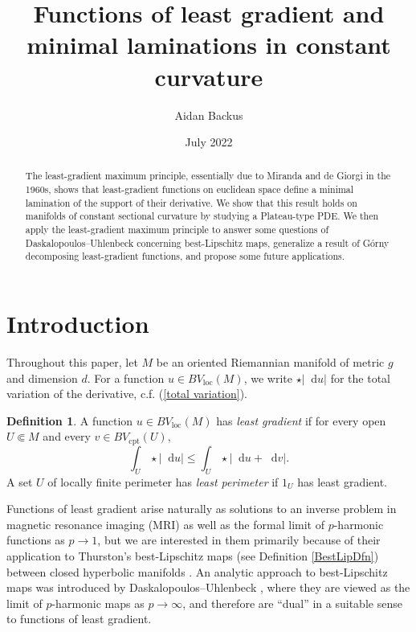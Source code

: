 \documentclass[reqno,10pt]{amsart}
\title{Functions of least gradient and minimal laminations in constant curvature}
\author{Aidan Backus}
\date{July 2022}
\newcommand*\dif{\mathop{}\!\mathrm{d}}
\newcommand{\dfn}[1]{\emph{#1}\index{#1}}
\newcommand{\loc}{\mathrm{loc}}
\newcommand{\cpt}{\mathrm{cpt}}
\theoremstyle{definition}
\newtheorem{definition}[theorem]{Definition}
\numberwithin{equation}{section}
\begin{document}
\begin{abstract}
The least-gradient maximum principle, essentially due to Miranda and de Giorgi in the 1960s, shows that least-gradient functions on euclidean space define a minimal lamination of the support of their derivative.
We show that this result holds on manifolds of constant sectional curvature by studying a Plateau-type PDE.
We then apply the least-gradient maximum principle to answer some questions of Daskalopoulos--Uhlenbeck concerning best-Lipschitz maps, generalize a result of G\'orny decomposing least-gradient functions, and propose some future applications.
\end{abstract}

\maketitle



\section{Introduction}
Throughout this paper, let $M$ be an oriented Riemannian manifold of metric $g$ and dimension $d$.
For a function $u \in BV_\loc(M)$, we write $\star |\dif u|$ for the total variation of the derivative, c.f. (\ref{total variation}).

\begin{definition}\label{main definitions}
A function $u \in BV_\loc(M)$ has \dfn{least gradient} if for every open $U \Subset M$ and every $v \in BV_\cpt(U)$,
\begin{equation}\label{least gradient functional}
\int_U \star |\dif u| \leq \int_U \star |\dif u + \dif v|.
\end{equation}
A set $U$ of locally finite perimeter has \dfn{least perimeter} if $1_U$ has least gradient.
\end{definition}

Functions of least gradient arise naturally as solutions to an inverse problem in magnetic resonance imaging (MRI) \cite{Nachman2009, Tamasan2019, Joy09} as well as the formal limit of $p$-harmonic functions as $p \to 1$, but we are interested in them primarily because of their application to Thurston's best-Lipschitz maps (see Definition \ref{BestLipDfn}) between closed hyperbolic manifolds \cite{thurston1998minimal}.
An analytic approach to best-Lipschitz maps was introduced by Daskalopoulos--Uhlenbeck \cite{daskalopoulos2020transverse, daskalopoulosPrep1}, where they are viewed as the limit of $p$-harmonic maps as $p \to \infty$, and therefore are ``dual'' in a suitable sense to functions of least gradient.
\end{document}

